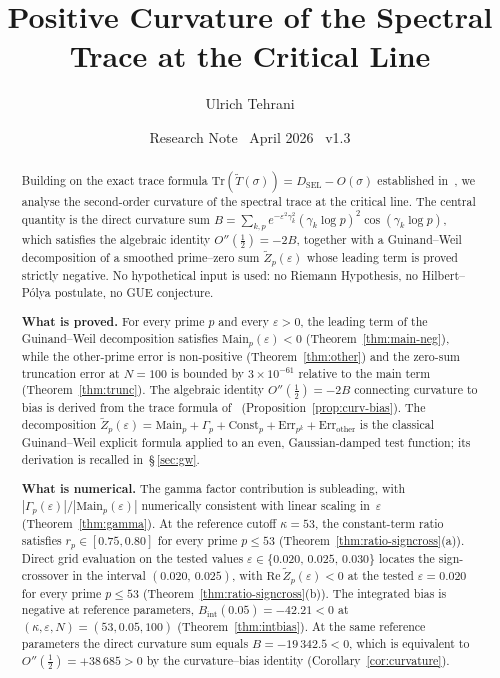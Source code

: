 \documentclass[11pt]{article}
\title{\vspace{-1.5em}\bfseries Positive Curvature of the Spectral Trace
at the Critical Line}
\author{Ulrich Tehrani}
\date{Research Note \textperiodcentered\ April 2026
      \textperiodcentered\ v1.3}
\newcommand{\Tt}{\widetilde{T}}
\newcommand{\Zt}{\widetilde{Z}}
\newcommand{\DSEL}{D_{\mathrm{SEL}}}
\begin{document}
\maketitle

\begin{abstract}
Building on the exact trace formula $\mathrm{Tr}(\Tt(\sigma))=\DSEL-O(\sigma)$
established in~\cite{Paper5}, we analyse the second-order curvature of the
spectral trace at the critical line.
The central quantity is the direct curvature sum
$B=\sum_{k,p} e^{-\varepsilon^2\gamma_k^2}(\gamma_k\log p)^2\cos(\gamma_k\log p)$,
which satisfies the algebraic identity $O''(\tfrac12)=-2B$, together with a
Guinand--Weil decomposition of a smoothed prime--zero sum $\Zt_p(\varepsilon)$
whose leading term is proved strictly negative.
No hypothetical input is used: no Riemann Hypothesis, no Hilbert--P\'olya
postulate, no GUE conjecture.

\textbf{What is proved.}
For every prime $p$ and every $\varepsilon>0$, the leading term of the
Guinand--Weil decomposition satisfies
$\mathrm{Main}_p(\varepsilon)<0$ (Theorem~\ref{thm:main-neg}), while the
other-prime error is non-positive
(Theorem~\ref{thm:other}) and the zero-sum truncation error at $N=100$
is bounded by $3\times 10^{-61}$ relative to the main term
(Theorem~\ref{thm:trunc}).
The algebraic identity $O''(\tfrac12)=-2B$ connecting curvature to bias
is derived from the trace formula of~\cite{Paper5}
(Proposition~\ref{prop:curv-bias}).
The decomposition
$\Zt_p(\varepsilon)=\mathrm{Main}_p+\Gamma_p+\mathrm{Const}_p
+\mathrm{Err}_{p^k}+\mathrm{Err}_{\mathrm{other}}$
is the classical Guinand--Weil explicit formula applied to an even,
Gaussian-damped test function; its derivation is recalled in~\S\,\ref{sec:gw}.

\textbf{What is numerical.}
The gamma factor contribution is subleading, with
$|\Gamma_p(\varepsilon)|/|\mathrm{Main}_p(\varepsilon)|$ numerically
consistent with linear scaling in~$\varepsilon$
(Theorem~\ref{thm:gamma}).
At the reference cutoff $\kappa=53$, the constant-term ratio satisfies
$r_p\in[0.75,0.80]$ for every prime $p\le 53$
(Theorem~\ref{thm:ratio-signcross}(a)).
Direct grid evaluation on the tested values
$\varepsilon\in\{0.020,\,0.025,\,0.030\}$ locates the sign-crossover
in the interval $(0.020,\,0.025)$, with
$\mathrm{Re}\,\Zt_p(\varepsilon)<0$ at the tested $\varepsilon=0.020$
for every prime $p\le 53$ (Theorem~\ref{thm:ratio-signcross}(b)).
The integrated bias is negative at reference parameters,
$B_{\mathrm{int}}(0.05)=-42.21<0$ at
$(\kappa,\varepsilon,N)=(53,0.05,100)$ (Theorem~\ref{thm:intbias}).
At the same reference parameters the direct curvature sum equals
$B=-19\,342.5<0$, which is equivalent to
$O''(\tfrac12)=+38\,685>0$ by the curvature--bias identity
(Corollary~\ref{cor:curvature}).


\end{abstract}
\end{document}
